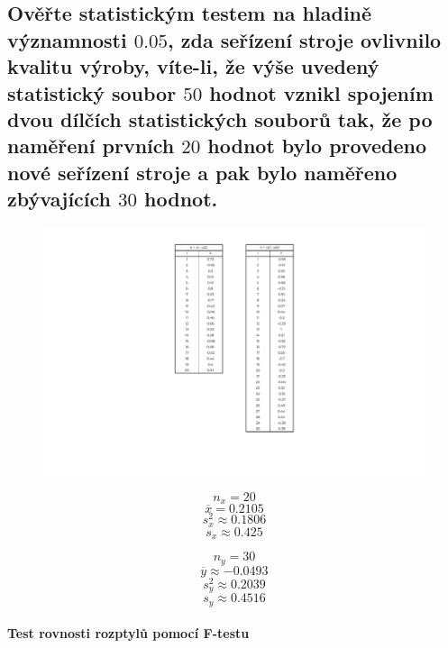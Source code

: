 
\subsection{Ověřte statistickým testem na hladině významnosti $0.05$, zda seřízení stroje ovlivnilo kvalitu výroby, víte-li, že výše uvedený statistický soubor $50$ hodnot vznikl spojením dvou dílčích statistických souborů tak, že po naměření prvních $20$ hodnot bylo provedeno nové seřízení stroje a pak bylo naměřeno zbývajících $30$ hodnot.}

\begin{figure}[H]
    \centering
    \includegraphics[width=.7\linewidth]{1-g-1-crop.pdf}
\end{figure}

\begin{minipage}{0.49\textwidth}
    $${\displaystyle n_x = 20}$$
    $${\displaystyle \overline{x} = 0.2105}$$
    $${\displaystyle s_x^2 \approx 0.1806}$$
    $${\displaystyle s_x \approx 0.425}$$
\end{minipage}
%
\begin{minipage}{0.49\textwidth}
    $${\displaystyle n_y = 30}$$
    $${\displaystyle \overline{y} \approx -0.0493}$$
    $${\displaystyle s_y^2 \approx 0.2039}$$
    $${\displaystyle s_y \approx 0.4516}$$
\end{minipage}

\paragraph*{Test rovnosti rozptylů pomocí F-testu}

